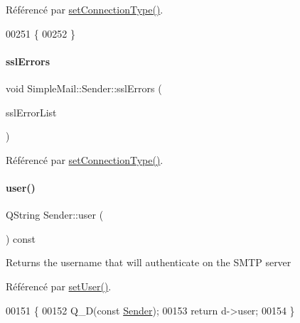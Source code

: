 Référencé par \hyperlink{class_simple_mail_1_1_sender_a879bee44b1e7afed564c82b81261a9b1}{set\+Connection\+Type()}.


\begin{DoxyCode}
00251 \{
00252 \}
\end{DoxyCode}
\mbox{\label{class_simple_mail_1_1_sender_a8b87c2e54a9dcd225495536cebc4fb27}} 
\paragraph{\texorpdfstring{ssl\+Errors}{sslErrors}}
{\footnotesize\ttfamily void Simple\+Mail\+::\+Sender\+::ssl\+Errors (\begin{DoxyParamCaption}\item[{const Q\+List$<$ Q\+Ssl\+Error $>$ \&}]{ssl\+Error\+List }\end{DoxyParamCaption})\hspace{0.3cm}{\ttfamily [signal]}}



Référencé par \hyperlink{class_simple_mail_1_1_sender_a879bee44b1e7afed564c82b81261a9b1}{set\+Connection\+Type()}.

\mbox{\label{class_simple_mail_1_1_sender_a70ce2ab650d894c40be88d82bd327c3b}} 
\paragraph{\texorpdfstring{user()}{user()}}
{\footnotesize\ttfamily Q\+String Sender\+::user (\begin{DoxyParamCaption}{ }\end{DoxyParamCaption}) const}

Returns the username that will authenticate on the S\+M\+TP server 

Référencé par \hyperlink{class_simple_mail_1_1_sender_a20251be6b7b4064cd5f20ea224333c4c}{set\+User()}.


\begin{DoxyCode}
00151 \{
00152     Q\_D(\textcolor{keyword}{const} \hyperlink{class_simple_mail_1_1_sender}{Sender});
00153     \textcolor{keywordflow}{return} d->user;
00154 \}
\end{DoxyCode}


